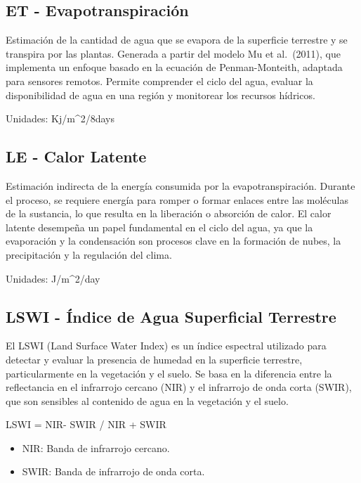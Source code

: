 \documentclass[
]{book}
\begin{document}
\subsection{\texorpdfstring{\textbf{ET} - Evapotranspiración}{ET - Evapotranspiración}}\label{et---evapotranspiraciuxf3n}

Estimación de la cantidad de agua que se evapora de la superficie terrestre y se transpira por las plantas. Generada a partir del modelo Mu et al.~(2011), que implementa un enfoque basado en la ecuación de Penman-Monteith, adaptada para sensores remotos. Permite comprender el ciclo del agua, evaluar la disponibilidad de agua en una región y monitorear los recursos hídricos.

Unidades: Kj/m\^{}2/8days

\subsection{\texorpdfstring{\textbf{LE} - Calor Latente}{LE - Calor Latente}}\label{le---calor-latente}

Estimación indirecta de la energía consumida por la evapotranspiración. Durante el proceso, se requiere energía para romper o formar enlaces entre las moléculas de la sustancia, lo que resulta en la liberación o absorción de calor. El calor latente desempeña un papel fundamental en el ciclo del agua, ya que la evaporación y la condensación son procesos clave en la formación de nubes, la precipitación y la regulación del clima.

Unidades: J/m\^{}2/day

\subsection{\texorpdfstring{\textbf{LSWI} - Índice de Agua Superficial Terrestre}{LSWI - Índice de Agua Superficial Terrestre}}\label{lswi---uxedndice-de-agua-superficial-terrestre}

El LSWI (Land Surface Water Index) es un índice espectral utilizado para detectar y evaluar la presencia de humedad en la superficie terrestre, particularmente en la vegetación y el suelo. Se basa en la diferencia entre la reflectancia en el infrarrojo cercano (NIR) y el infrarrojo de onda corta (SWIR), que son sensibles al contenido de agua en la vegetación y el suelo.

LSWI = NIR- SWIR / NIR + SWIR\hspace{0pt}

\begin{itemize}
\item
  NIR: Banda de infrarrojo cercano.
\item
  SWIR: Banda de infrarrojo de onda corta.
\end{itemize}
\end{document}

